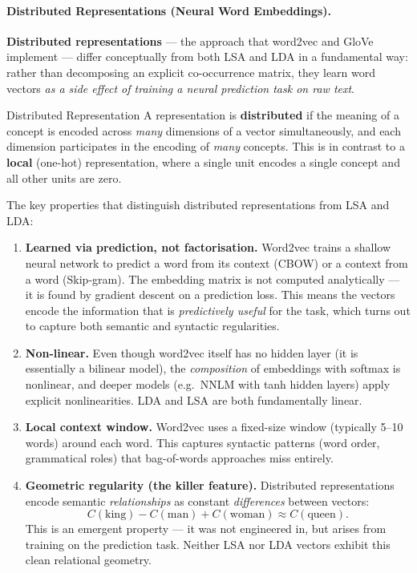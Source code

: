 \documentclass[11pt,a4paper]{article}
\newcommand{\term}[1]{\textcolor{DefGreen}{\textbf{#1}}\index{#1}}
\begin{document}
\paragraph{Distributed Representations (Neural Word Embeddings).}

\term{Distributed representations} — the approach that word2vec and GloVe implement — differ conceptually from both LSA and LDA in a fundamental way: rather than decomposing an explicit co-occurrence matrix, they learn word vectors \emph{as a side effect of training a neural prediction task on raw text}.

\begin{defbox}{Distributed Representation}
A representation is \textbf{distributed} if the meaning of a concept is encoded across \emph{many} dimensions of a vector simultaneously, and each dimension participates in the encoding of \emph{many} concepts. This is in contrast to a \textbf{local} (one-hot) representation, where a single unit encodes a single concept and all other units are zero.
\end{defbox}

The key properties that distinguish distributed representations from LSA and LDA:

\begin{enumerate}
  \item \textbf{Learned via prediction, not factorisation.}  Word2vec trains a shallow neural network to predict a word from its context (CBOW) or a context from a word (Skip-gram). The embedding matrix is not computed analytically — it is found by gradient descent on a prediction loss. This means the vectors encode the information that is \emph{predictively useful} for the task, which turns out to capture both semantic and syntactic regularities.

  \item \textbf{Non-linear.}  Even though word2vec itself has no hidden layer (it is essentially a bilinear model), the \emph{composition} of embeddings with softmax is nonlinear, and deeper models (e.g.\ NNLM with tanh hidden layers) apply explicit nonlinearities. LDA and LSA are both fundamentally linear.

  \item \textbf{Local context window.}  Word2vec uses a fixed-size window (typically 5--10 words) around each word. This captures syntactic patterns (word order, grammatical roles) that bag-of-words approaches miss entirely.

  \item \textbf{Geometric regularity (the killer feature).}  Distributed representations encode semantic \emph{relationships} as constant \emph{differences} between vectors:
  \[
    C(\text{king}) - C(\text{man}) + C(\text{woman}) \approx C(\text{queen}).
  \]
  This is an emergent property — it was not engineered in, but arises from training on the prediction task. Neither LSA nor LDA vectors exhibit this clean relational geometry.
\end{enumerate}
\end{document}
